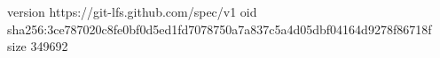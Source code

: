 version https://git-lfs.github.com/spec/v1
oid sha256:3ce787020c8fe0bf0d5ed1fd7078750a7a837c5a4d05dbf04164d9278f86718f
size 349692

